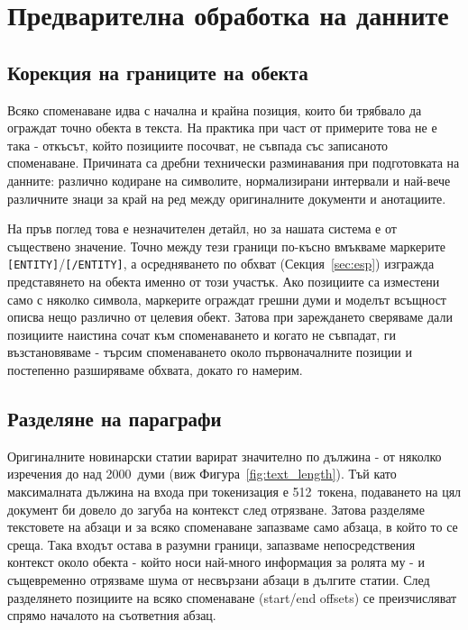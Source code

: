 \documentclass[12pt,a4paper]{report}
\begin{document}
\section{Предварителна обработка на данните}
\label{sec:preprocessing}

\subsection{Корекция на границите на обекта}
\label{sec:offset_correction}

Всяко споменаване идва с начална и крайна позиция, които би трябвало да ограждат точно обекта в текста. На практика при част от примерите това не е така - откъсът, който позициите посочват, не съвпада със записаното споменаване. Причината са дребни технически разминавания при подготовката на данните: различно кодиране на символите, нормализирани интервали и най-вече различните знаци за край на ред между оригиналните документи и анотациите.

На пръв поглед това е незначителен детайл, но за нашата система е от съществено значение. Точно между тези граници по-късно вмъкваме маркерите \texttt{[ENTITY]}/\texttt{[/ENTITY]}, а осредняването по обхват (Секция~\ref{sec:esp}) изгражда представянето на обекта именно от този участък. Ако позициите са изместени само с няколко символа, маркерите ограждат грешни думи и моделът всъщност описва нещо различно от целевия обект. Затова при зареждането сверяваме дали позициите наистина сочат към споменаването и когато не съвпадат, ги възстановяваме - търсим споменаването около първоначалните позиции и постепенно разширяваме обхвата, докато го намерим.

\subsection{Разделяне на параграфи}

Оригиналните новинарски статии варират значително по дължина - от няколко изречения до над 2000~думи (виж Фигура~\ref{fig:text_length}). Тъй като максималната дължина на входа при токенизация е 512~токена, подаването на цял документ би довело до загуба на контекст след отрязване. Затова разделяме текстовете на абзаци и за всяко споменаване запазваме само абзаца, в който то се среща. Така входът остава в разумни граници, запазваме непосредствения контекст около обекта - който носи най-много информация за ролята му - и същевременно отрязваме шума от несвързани абзаци в дългите статии. След разделянето позициите на всяко споменаване (start/end offsets) се преизчисляват спрямо началото на съответния абзац.
\end{document}
